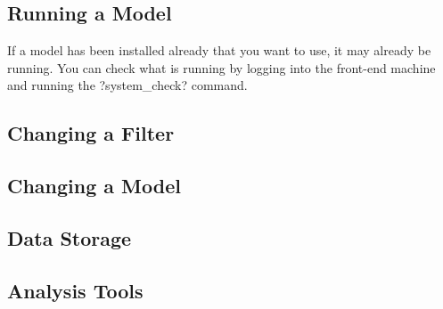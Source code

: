 \subsection{Running a Model}

If a model has been installed already that you want to use, it may already be
running. You can check what is running by logging into the front-end machine
and running the \lstin?system_check? command.

\subsection{Changing a Filter}

\subsection{Changing a Model}

\subsection{Data Storage}

\subsection{Analysis Tools}


